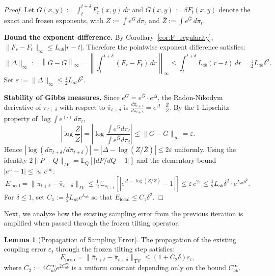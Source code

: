 \documentclass[11pt]{article}
\theoremstyle{definition}
\newtheorem{lemma}[theorem]{Lemma}
\numberwithin{equation}{section}%
\begin{document}
{\begin{proof}
Let $G(x,y) := \int_t^{t+\delta} F_r(x,y)\,dr$ and $\bar{G}(x,y) := \delta F_t(x,y)$
denote the exact and frozen exponents, with $Z := \int e^G\,d\pi_t$ and $\bar{Z} := \int e^{\bar{G}}\,d\pi_t$.

\medskip\noindent\textbf{Bound the exponent difference.}
By Corollary~\ref{cor:F_regularity},
$\|F_r - F_t\|_\infty \le L_{ab}|r - t|$. Therefore the pointwise exponent difference satisfies:
\[
\|\Delta\|_\infty := \left\| G - \bar{G} \right\|_\infty
= \left\| \int_t^{t+\delta} (F_r - F_t)\,dr \right\|_\infty
\le \int_t^{t+\delta} L_{ab}(r-t)\,dr = \tfrac{1}{2}L_{ab}\delta^2.
\]
Set $\varepsilon := \|\Delta\|_\infty \le \tfrac{1}{2}L_{ab}\delta^2$.

\medskip\noindent\textbf{Stability of Gibbs measures.}
Since $e^G = e^{\bar{G}} \cdot e^{\Delta}$, the Radon-Nikodym derivative of $\pi_{t+\delta}$
with respect to $\bar{\pi}_{t+\delta}$ is
$\frac{d\pi_{t+\delta}}{d\bar{\pi}_{t+\delta}} = e^{\Delta} \cdot \frac{\bar{Z}}{Z}.$
By the 1-Lipschitz property of $\log\int e^{(\cdot)}\,d\pi_t$,
\[
\left|\log \frac{Z}{\bar{Z}}\right|
= \left|\log\frac{\int e^G d\pi_t}{\int e^{\bar{G}} d\pi_t}\right|
\le \|G - \bar{G}\|_\infty = \varepsilon.
\]
Hence $|\log(d\pi_{t+\delta}/d\bar{\pi}_{t+\delta})| = |\Delta - \log(Z/\bar{Z})| \le 2\varepsilon$ uniformly.
Using the identity $2\|P - Q\|_{TV} = \mathbb{E}_Q[|dP/dQ - 1|]$ and the elementary bound $|e^u - 1| \le |u|\,e^{|u|}$:
\[
E_{\mathrm{local}}
= \|\pi_{t+\delta} - \bar{\pi}_{t+\delta}\|_{TV}
\le \tfrac{1}{2}\,\mathbb{E}_{\bar{\pi}_{t+\delta}}\!\left[\left|e^{\Delta - \log(Z/\bar{Z})} - 1\right|\right]
\le \varepsilon\,e^{2\varepsilon}
\le \tfrac{1}{2}L_{ab}\delta^2 \cdot e^{L_{ab}\delta^2}.
\]
For $\delta \le 1$, set $C_1 := \tfrac{1}{2}L_{ab}e^{L_{ab}}$ so that $E_{\mathrm{local}} \le C_1\delta^2$.
\end{proof}


Next, we analyze how the existing sampling error from the previous iteration is amplified when passed through the frozen tilting operator.
\begin{lemma}[Propagation of Sampling Error]
\label{lem:prop_error_tv}
The propagation of the existing coupling error $\varepsilon_t$ through the frozen tilting step satisfies:
\begin{equation}
E_{\mathrm{prop}} = \|\bar{\pi}_{t+\delta} - \tilde{\pi}_{t+\delta}\|_{\mathrm{TV}} \le (1 + C_2 \delta) \varepsilon_t,
\end{equation}
where $C_2 := 4 C_{ab}^\infty e^{2 C_{ab}^\infty}$ is a uniform constant depending only on the bound $C_{ab}^\infty$.
\end{lemma}

}
\end{document}
